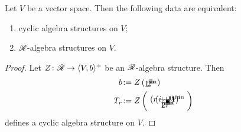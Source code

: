 \begin{theorem}\label{thm:gc-cyc}
  Let $V$ be a vector space. Then the following data are equivalent:
  \begin{enumerate}
  \item cyclic algebra structures on $V$;
  \item $\mathscr{R}$-algebra structures on $V$.
  \end{enumerate}
\end{theorem}
\begin{proof} Let $Z\colon\mathscr{R}\to\langle V,b\rangle^+$ be an $\mathscr{R}$-algebra structure.
  Then
  \begin{align*}
    b &\joinrel:= Z\left(\xy*!LC\xybox{%
        \vloop~{(0,0.5)}{(1,0.5)}{(0,-0.5)}{(1,-0.5)},(0,-0.7)*{1^{\textrm{in}}}%
        ,(1,-0.7)*{2^{\textrm{in}}}}
      \endxy\right)
    \\
    T_r &\joinrel:= Z\left(\xy*!LC\xybox{
        (0,1)*{\bullet};%
        (-1,0)*+{1^{\textrm{in}}}**\dir{-},(-0.5,0)*+{2^{\textrm{in}}}**\dir{-},%
        (0,0.5)*+{\ldots},(1,0)*+{i^{\textrm{in}}}**\dir{-},%
        (-1,2)*+{(r+1)^{\textrm{in}}}**\dir{-}%
        ,(-0.5,2)*+{\ \ \ r^{\textrm{in}}}**\dir{-},%
        (0,1.5)*+{\ldots},(1,2)*+{(i+1)^{\textrm{in}}}**\dir{-},%
        }\endxy\right) 
  \end{align*}
  defines a cyclic algebra structure on $V$.
  

\end{proof}
